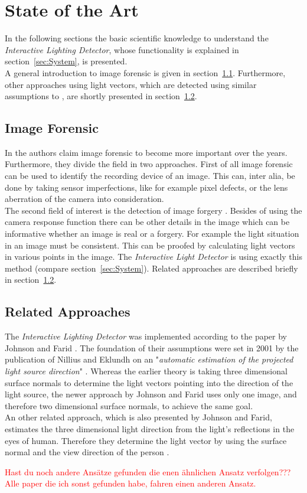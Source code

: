 \section{State of the Art} \label{sec:StateOfTheArt}
In the following sections the basic scientific knowledge to understand the \textit{Interactive Lighting Detector}, whose functionality is explained in section~\ref{sec:System}, is presented.\\
A general introduction to image forensic is given in section~\ref{sec:imageForensic}.
Furthermore, other approaches using light vectors, which are detected using similar assumptions to \cite{Johnson}, are shortly presented in section~\ref{sec:otherApproaches}.


\subsection{Image Forensic}\label{sec:imageForensic}
In \cite{4284575} the authors claim image forensic to become more important over the years. Furthermore, they divide the field in two approaches. First of all image forensic can be used to identify the recording device of an image. This can, inter alia, be done by taking sensor imperfections, like for example pixel defects, or the lens aberration of the camera into consideration. \\
The second field of interest is the detection of image forgery \cite{4806202}. Besides of using the camera response function there can be other details in the image which can be informative whether an image is real or a forgery. For example the light situation in an image must be consistent. This can be proofed by calculating light vectors in various points in the image. The \textit{Interactive Light Detector} is using exactly this method (compare section~\ref{sec:System}). Related approaches are described briefly in section~\ref{sec:otherApproaches}.


\subsection{Related Approaches} \label{sec:otherApproaches}
The \textit{Interactive Lighting Detector} was implemented according to the paper by Johnson and Farid \cite{Johnson}. The foundation of their assumptions were set in 2001 by the publication of Nillius and Eklundh on an "\textit{automatic estimation of the projected light source direction}" \cite{990650}. Whereas the earlier theory is taking three dimensional surface normals to determine the light vectors pointing into the direction of the light source, the newer approach by Johnson and Farid uses only one image, and therefore two dimensional surface normals, to achieve the same goal. \\
An other related approach, which is also presented by Johnson and Farid, estimates the three dimensional light direction from the light's reflections in the eyes of human. Therefore they determine the light vector by using the surface normal and the view direction of the person \cite{johnson06specular}.

\textcolor{red}{Hast du noch andere Ansätze gefunden die enen ähnlichen Ansatz verfolgen??? Alle paper die ich sonst gefunden habe, fahren einen anderen Ansatz.} 


\newpage
